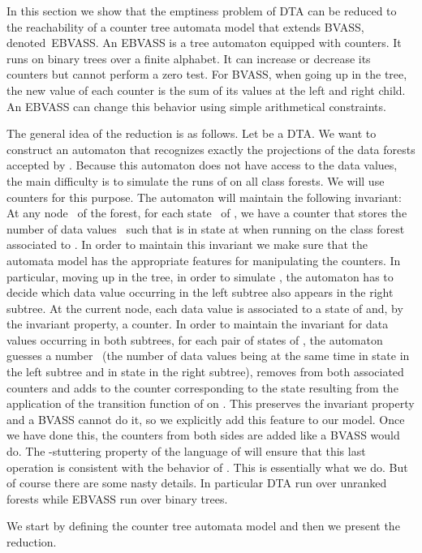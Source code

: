 \documentclass{CSML}
\newcommand\bvass{\textup{BVASS}\xspace}
\newcommand\ebvass{\textup{EBVASS}\xspace}
\newcommand\dad{\textup{DTA}\xspace}
\begin{document}
In this section we show that the emptiness problem of \dad can be reduced to
the reachability of a counter tree automata model that extends \bvass, denoted~\ebvass. 
An \ebvass is a tree automaton equipped with counters.  It runs on
binary trees over a finite alphabet.  It can increase or decrease its
counters but cannot perform a zero test.  For \bvass, when going up in the
tree, the new value of each counter is the sum of its values at the left and
right child. An \ebvass can change this behavior using simple arithmetical
constraints.


The general idea of the reduction is as follows. 
\label{sketch:sec-dad-counter}
Let  be a \dad. 
We want to construct
an automaton that recognizes exactly the projections of the data forests
accepted by . Because this automaton does not have access to the data
values, the main difficulty is to simulate the runs of  on all class
forests. We will use counters for this purpose. The automaton will maintain the
following invariant: At any node~ of the forest, for each state~ of
, we have a counter that stores the number of data values~ such that
 is in state  at  when running on the class forest associated to
. In order to maintain this invariant we make sure that the  automata
model has the appropriate features for manipulating the counters. In
particular, moving up in the tree, in order to simulate , 
the automaton has to decide which data value occurring 
in the left subtree also appears in the right subtree.  
At the current node, each data value is associated to a state of  
and, by the invariant property, a counter. In order to maintain the invariant for data
values occurring in both subtrees, for each pair  of states of , the
automaton guesses a number~ (the number of data values being at the same
time in state  in the left subtree and in state  in the right subtree),
removes  from both associated counters and adds  to the counter
corresponding to the state resulting from the application of the transition function of
 on . This preserves the invariant property and a BVASS cannot do it, so we explicitly add this feature to our model. Once we
have done this, the counters from both sides are added like a BVASS would do. 
The -stuttering property of the language of  will ensure that this last operation
is consistent with the behavior of .
This is essentially what we do. But of course there are some nasty details. In
particular \dad run over unranked forests while \ebvass run over binary trees.


We start by defining the counter tree automata model and then we present
the reduction.
\end{document}
